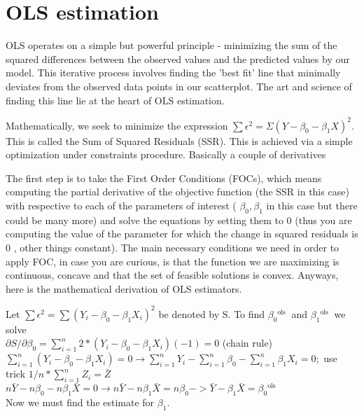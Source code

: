 \documentclass[10pt]{article}
\begin{document}
\section*{OLS estimation}
OLS operates on a simple but powerful principle - minimizing the sum of the squared differences between the observed values and the predicted values by our model. This iterative process involves finding the 'best fit' line that minimally deviates from the observed data points in our scatterplot. The art and science of finding this line lie at the heart of OLS estimation.

Mathematically, we seek to minimize the expression $\sum \epsilon^{2}=\Sigma\left(Y-\beta_{0}-\beta_{1} X\right)^{2}$. This is called the Sum of Squared Residuals (SSR). This is achieved via a simple optimization under constraints procedure. Basically a couple of derivatives

The first step is to take the First Order Conditions (FOCs), which means computing the partial derivative of the objective function (the SSR in this case) with respective to each of the parameters of interest ( $\beta_{0}, \beta_{1}$ in this case but there could be many more) and solve the equations by setting them to 0 (thus you are computing the value of the parameter for which the change in squared residuals is 0 , other things constant). The main necessary conditions we need in order to apply FOC, in case you are curious, is that the function we are maximizing is continuous, concave and that the set of feasible solutions is convex. Anyways, here is the mathematical derivation of OLS estimators.

Let $\sum \epsilon^{2}=\sum\left(Y_{i}-\beta_{0}-\beta_{1} X_{i}\right)^{2}$ be denoted by S. To find $\beta_{0}{ }^{\text {ols }}$ and $\beta_{1}{ }^{\text {ols }}$ we solve\\
$\partial S / \partial \beta_{0}=\sum_{i=1}^{n} 2 *\left(Y_{i}-\beta_{0}-\beta_{1} X_{i}\right)(-1)=0$ (chain rule)\\
$\sum_{i=1}^{n}\left(Y_{i}-\beta_{0}-\beta_{1} X_{i}\right)=0 \rightarrow \sum_{i=1}^{n} Y_{i}-\sum_{i=1}^{n} \beta_{0}-\sum_{i=1}^{n} \beta_{1} X_{i}=0 ;$ use trick $1 / n * \sum_{i=1}^{n} Z_{i}=\bar{Z}$\\
$n \bar{Y}-n \beta_{0}-n \beta_{1} \bar{X}=0 \rightarrow n \bar{Y}-n \beta_{1} \bar{X}=n \beta_{0}->\bar{Y}-\beta_{1} \bar{X}=\beta_{0}{ }^{\text {ols }}$\\
Now we must find the estimate for $\beta_{1}$.
\end{document}
